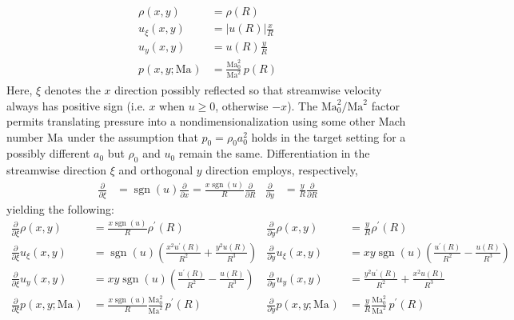 \documentclass[letterpaper,11pt,nointlimits,reqno]{amsart}
\newcommand{\Mach}[1][]{\mbox{Ma}_{#1}}
\begin{document}
\begin{align}
    \rho \!\left(x, y\right) &= \rho\!\left(R\right)
\\  u_\xi\!\left(x, y\right) &= \left|u\!\left(R\right)\right| \frac{x}{R}
\\  u_y  \!\left(x, y\right) &=       u\!\left(R\right)        \frac{y}{R}
\\  p    \!\left(x, y; \Mach\right) &= \frac{\Mach[0]^2}{\Mach^2} \, p\!\left(R\right)
\end{align}
%
Here, $\xi$ denotes the $x$ direction possibly reflected so that streamwise
velocity always has positive sign (i.e. $x$ when $u\geq{}0$, otherwise $-x$).
The $\Mach[0]^2/\Mach^2$ factor permits translating pressure into a
nondimensionalization using some other Mach number $\Mach$ under the assumption
that $p_0 = \rho_0 a_0^2$ holds in the target setting for a possibly different
$a_0$ but $\rho_0$ and $u_0$ remain the same.
%
Differentiation in the streamwise direction $\xi$ and orthogonal $y$ direction
employs, respectively,
\begin{align}
    \frac{\partial}{\partial\xi}
 &= \operatorname{sgn}(u) \frac{\partial}{\partial{}x}
  = \frac{x \operatorname{sgn}(u)}{R} \frac{\partial}{\partial{}R}
&
    \frac{\partial}{\partial{}y}
 &= \frac{y}{R} \frac{\partial}{\partial{}R}
\end{align}
yielding the following:
%
\begin{align}
  \frac{\partial}{\partial\xi} \rho \!\left(x, y\right)
&=
  \frac{x\operatorname{sgn}(u)}{R} \rho^\prime\!\left(R\right)
&
  \frac{\partial}{\partial{}y} \rho \!\left(x, y\right)
&=
  \frac{y                     }{R} \rho^\prime\!\left(R\right)
\\
  \frac{\partial}{\partial\xi} u_\xi\!\left(x, y\right)
&=
  \operatorname{sgn}(u) \left(
      \frac{x^2 u^\prime\!\left(R\right)}{R^2}
    + \frac{y^2 u       \!\left(R\right)}{R^3}
  \right)
&
  \frac{\partial}{\partial{}y} u_\xi\!\left(x, y\right)
&=
  x y \operatorname{sgn}(u) \left(
      \frac{u^\prime\!\left(R\right)}{R^2}
    - \frac{u       \!\left(R\right)}{R^3}
  \right)
\\
  \frac{\partial}{\partial\xi} u_y  \!\left(x, y\right)
&=
  x y \operatorname{sgn}(u) \left(
      \frac{u^\prime\!\left(R\right)}{R^2}
    - \frac{u       \!\left(R\right)}{R^3}
  \right)
&
  \frac{\partial}{\partial{}y} u_y  \!\left(x, y\right)
&=
    \frac{ y^2 u^\prime\!\left(R\right) }{ R^2 }
  + \frac{ x^2 u       \!\left(R\right) }{ R^3 }
\\
  \frac{\partial}{\partial\xi} p    \!\left(x, y; \Mach\right)
&=
  \frac{x\operatorname{sgn}(u)}{R}
  \frac{\Mach[0]^2}{\Mach^2}
  \,
  p^\prime\!\left(R\right)
&
  \frac{\partial}{\partial{}y} p    \!\left(x, y; \Mach\right)
&=
  \frac{y                     }{R}
  \frac{\Mach[0]^2}{\Mach^2}
  \,
  p^\prime\!\left(R\right)
\end{align}
\end{document}
